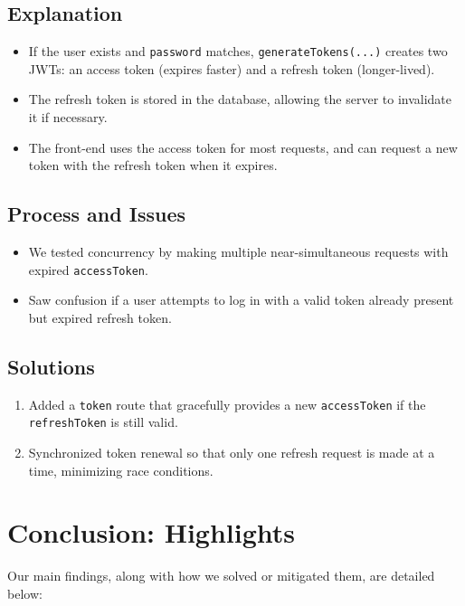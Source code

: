 \documentclass{article}
\begin{document}
\subsection{Explanation}
\begin{itemize}
  \item If the user exists and \texttt{password} matches, \texttt{generateTokens(...)} creates two JWTs: an access token (expires faster) and a refresh token (longer-lived).
  \item The refresh token is stored in the database, allowing the server to invalidate it if necessary.
  \item The front-end uses the access token for most requests, and can request a new token with the refresh token when it expires.
\end{itemize}

\subsection{Process and Issues}
\begin{itemize}
  \item We tested concurrency by making multiple near-simultaneous requests with expired \texttt{accessToken}. 
  \item Saw confusion if a user attempts to log in with a valid token already present but expired refresh token. 
\end{itemize}

\subsection{Solutions}
\begin{enumerate}
  \item Added a \texttt{token} route that gracefully provides a new \texttt{accessToken} if the \texttt{refreshToken} is still valid. 
  \item Synchronized token renewal so that only one refresh request is made at a time, minimizing race conditions.
\end{enumerate}


\section{Conclusion: Highlights}

Our main findings, along with how we solved or mitigated them, are detailed below:
\end{document}
